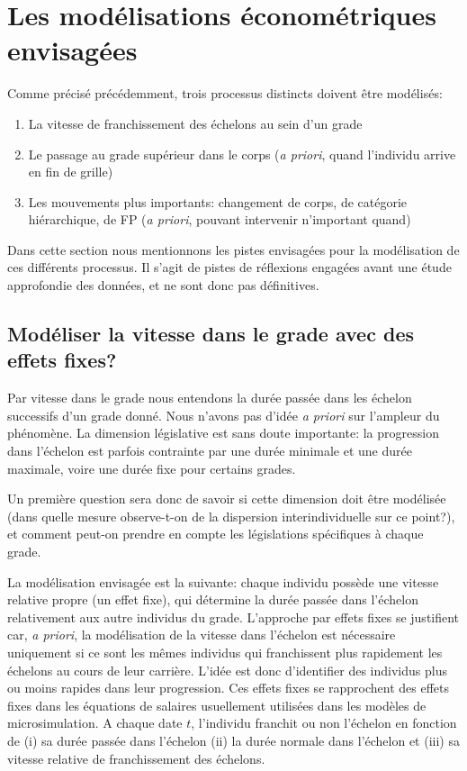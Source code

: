 \documentclass[11pt,a4paper]{article}
\begin{document}
\else \fi



\section{Les modélisations économétriques envisagées}

Comme précisé précédemment, trois processus distincts doivent être modélisés: 
\begin{enumerate}[leftmargin=1cm ,parsep=0cm,itemsep=0cm,topsep=0cm]
\item La vitesse de franchissement des échelons au sein d'un grade
\item Le passage au grade supérieur dans le corps (\textit{a priori}, quand l'individu arrive en fin de grille)
\item Les mouvements plus importants: changement de corps, de catégorie hiérarchique, de FP (\textit{a priori}, pouvant intervenir n'important quand)
\end{enumerate}

Dans cette section nous mentionnons les pistes envisagées pour la modélisation de ces différents processus. Il s'agit de pistes de réflexions engagées avant une étude approfondie des données, et ne sont donc pas définitives. 


\subsection{Modéliser la vitesse dans le grade avec des effets fixes?}

Par vitesse dans le grade nous entendons la durée passée dans les échelon successifs d'un grade donné. Nous n'avons pas d'idée \textit{a priori} sur l'ampleur du phénomène. La dimension législative est sans doute importante: la progression dans l'échelon est parfois contrainte par une durée minimale et une durée maximale, voire une durée fixe pour certains grades. 

Un première question sera donc de savoir si cette dimension doit être modélisée (dans quelle mesure observe-t-on de la dispersion interindividuelle sur ce point?), et comment peut-on prendre en compte les législations spécifiques à chaque grade. 

La modélisation envisagée est la suivante: chaque individu possède une vitesse relative propre (un effet fixe), qui détermine la durée passée dans l'échelon relativement aux autre individus du grade. L'approche par effets fixes se justifient car, \textit{a priori}, la modélisation de la vitesse dans l'échelon est nécessaire uniquement si ce sont les mêmes individus qui franchissent plus rapidement les échelons au cours de leur carrière. L'idée est donc d'identifier des individus plus ou moins \og rapides \fg{} dans leur progression. Ces effets fixes se rapprochent des effets fixes dans les équations de salaires usuellement utilisées dans les modèles de microsimulation.  
A chaque date $t$, l'individu franchit ou non l'échelon en fonction de (i) sa durée passée dans l'échelon (ii) la durée \og normale \fg{} dans l'échelon et (iii) sa vitesse relative de franchissement des échelons. 
\end{document}
